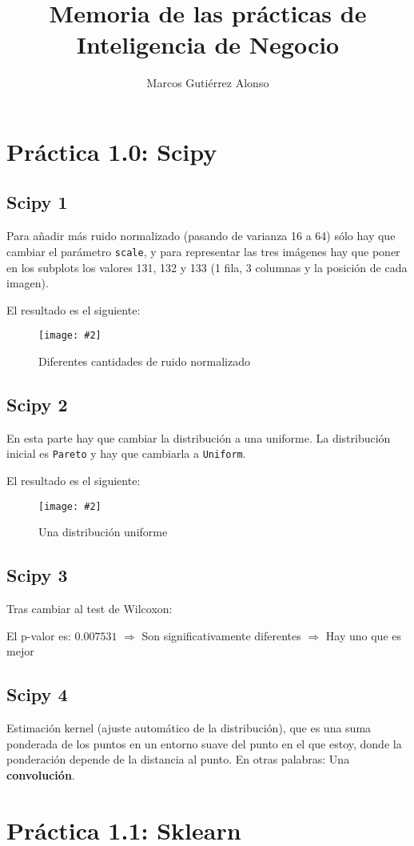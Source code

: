 \documentclass[
12pt, 
spanish, 
singlespacing,
headsepline
]{article}
\author{Marcos Gutiérrez Alonso}
\title{Memoria de las prácticas de Inteligencia de Negocio}
\newcommand{\image}[2]{
\begin{figure}[H]
	\caption{#1}
	\centering
	\texttt{[image: \#2]}
\end{figure}
}
\begin{document}
\begin{titlepage}
	\maketitle
	\tableofcontents
\end{titlepage}

\section{Práctica 1.0: Scipy}
\subsection{Scipy 1}
Para añadir más ruido normalizado (pasando de varianza 16 a 64) sólo hay que cambiar el parámetro \texttt{scale}, y para representar las tres imágenes hay que poner en los subplots los valores 131, 132 y 133 (1 fila, 3 columnas y la posición de cada imagen).

El resultado es el siguiente:
\image{Diferentes cantidades de ruido normalizado}{pl1/Figure\_1.png}

\subsection{Scipy 2}
En esta parte hay que cambiar la distribución a una uniforme.
La distribución inicial es \texttt{Pareto} y hay que cambiarla a \texttt{Uniform}.

El resultado es el siguiente:
\image{Una distribución uniforme}{pl1/Figure_2.png}

\subsection{Scipy 3}
Tras cambiar al test de Wilcoxon: 

El p-valor es: $0.007531$ $\Rightarrow$ Son significativamente diferentes $\Rightarrow$ Hay uno que es mejor

\subsection{Scipy 4}
Estimación kernel (ajuste automático de la distribución), que es una suma ponderada de los puntos en un entorno suave del punto en el que estoy, donde la ponderación depende de la distancia al punto. En otras palabras: Una \textbf{convolución}.

\section{Práctica 1.1: Sklearn}
\end{document}
